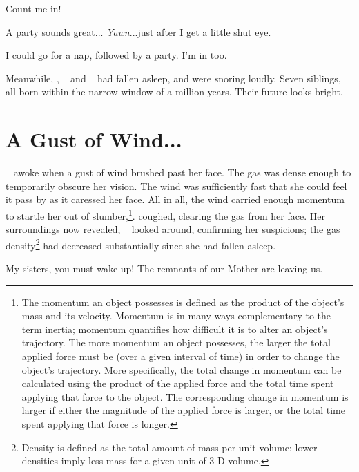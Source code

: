 \documentclass[main.tex]{subfiles}
\begin{document}
\par \Merope  Count me in!  

\par \Electra A party sounds great... \textit{Yawn}...just after I get a little shut eye.

\par \Sterope I could go for a nap, followed by a party.  I'm in too.

\par \nar Meanwhile, \rmtaygete, \rmalcyone~ and \rmcelaeno~ had fallen asleep, and were snoring loudly.  Seven siblings, all born within the narrow window of a million years.  Their future looks bright.

\section{A Gust of Wind...}

\par \nar \rmsterope~ awoke when a gust of wind brushed past her face.  The gas was dense enough to temporarily obscure her vision.  The wind was sufficiently fast that she could feel it pass by as it caressed her face.  All in all, the wind carried enough momentum to startle her out of slumber,\footnote{The momentum an object possesses is defined as the product of the object's mass and its velocity.  Momentum is in many ways complementary to the term inertia; momentum quantifies how difficult it is to alter an object's trajectory.  The more momentum an object possesses, the larger the total applied force must be (over a given interval of time) in order to change the object's trajectory.  More specifically, the total change in momentum can be calculated using the product of the applied force and the total time spent applying that force to the object.  The corresponding change in momentum is larger if either the magnitude of the applied force is larger, or the total time spent applying that force is longer.}.  \rmsterope coughed, clearing the gas from her face.  Her surroundings now revealed, \rmsterope~ looked around, confirming her suspicions; the gas density\footnote{Density is defined as the total amount of mass per unit volume; lower densities imply less mass for a given unit of 3-D volume.} had decreased substantially since she had fallen asleep.  

\par \Sterope My sisters, you must wake up!  The remnants of our Mother are leaving us.
\end{document}
